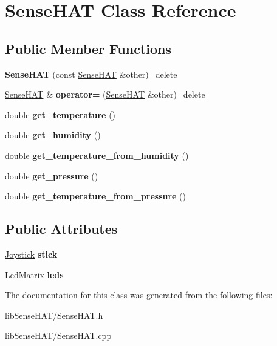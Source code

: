 \hypertarget{class_sense_h_a_t}{}\section{Sense\+H\+AT Class Reference}
\label{class_sense_h_a_t}
\subsection*{Public Member Functions}
\begin{DoxyCompactItemize}
\item 
\mbox{\label{class_sense_h_a_t_a39f7095d97dd434479c05e85bdc32952}} 
{\bfseries Sense\+H\+AT} (const \mbox{\hyperlink{class_sense_h_a_t}{Sense\+H\+AT}} \&other)=delete
\item 
\mbox{\label{class_sense_h_a_t_aa05efe7c4e0933067e3b655470dfd6df}} 
\mbox{\hyperlink{class_sense_h_a_t}{Sense\+H\+AT}} \& {\bfseries operator=} (\mbox{\hyperlink{class_sense_h_a_t}{Sense\+H\+AT}} \&other)=delete
\item 
\mbox{\label{class_sense_h_a_t_ae0d2f1c110a5dfe453bdb2f22cf719c0}} 
double {\bfseries get\+\_\+temperature} ()
\item 
\mbox{\label{class_sense_h_a_t_a270dbefc2b736c1ef3dfc996f968611f}} 
double {\bfseries get\+\_\+humidity} ()
\item 
\mbox{\label{class_sense_h_a_t_af1ffda111c9826f7eb3b88aa0ea29a00}} 
double {\bfseries get\+\_\+temperature\+\_\+from\+\_\+humidity} ()
\item 
\mbox{\label{class_sense_h_a_t_a6fcb3739537d351a60375a8aa8309a4e}} 
double {\bfseries get\+\_\+pressure} ()
\item 
\mbox{\label{class_sense_h_a_t_abe8f9a29726dbfeac2bd45cff6f8a984}} 
double {\bfseries get\+\_\+temperature\+\_\+from\+\_\+pressure} ()
\end{DoxyCompactItemize}
\subsection*{Public Attributes}
\begin{DoxyCompactItemize}
\item 
\mbox{\label{class_sense_h_a_t_a69d5712bf0663364109f9a482178dc2c}} 
\mbox{\hyperlink{class_joystick}{Joystick}} {\bfseries stick}
\item 
\mbox{\label{class_sense_h_a_t_a09557e42b20ddddc1763917bd36f36a7}} 
\mbox{\hyperlink{class_led_matrix}{Led\+Matrix}} {\bfseries leds}
\end{DoxyCompactItemize}


The documentation for this class was generated from the following files\+:\begin{DoxyCompactItemize}
\item 
lib\+Sense\+H\+A\+T/Sense\+H\+A\+T.\+h\item 
lib\+Sense\+H\+A\+T/Sense\+H\+A\+T.\+cpp\end{DoxyCompactItemize}
